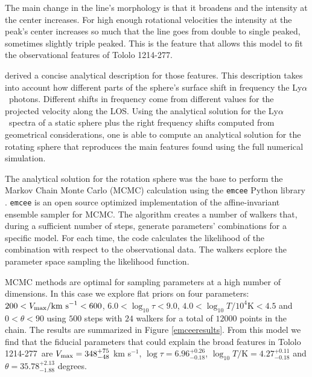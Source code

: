 \documentclass[a4paper, usenatbib, 12pt]{article}
\newcommand{\tol}{Tololo 1214-277}
\newcommand{\lya}{Ly$\alpha$}
\begin{document}
{The main change in the line's morphology is that it broadens and the
intensity at the center increases. 
For high enough rotational velocities the intensity at the peak's
center increases so much that the line goes from double to single
peaked, sometimes slightly triple peaked.
This is the feature that allows this model to fit the observational
features of \tol.

\cite{GaravitoCamargo2014} derived a concise analytical description for
those features. 
This description takes into account how different parts of the
sphere's surface shift in frequency the \lya\ photons. 
Different shifts in frequency come from different values for the projected
velocity along the LOS. 
Using the analytical solution for the \lya\ spectra of a static sphere
plus the right frequency shifts  computed from geometrical
considerations, one is able to compute an analytical solution for the
rotating sphere that reproduces the main features found using the full
numerical simulation. 

The analytical solution for the rotation sphere was the base to
perform the Markov Chain Monte Carlo (MCMC) calculation using the
\texttt{emcee} Python library \cite{2013PASP..125..306F}. \texttt{emcee} 
is an open source optimized implementation of the affine-invariant 
ensemble sampler for MCMC. The algorithm creates a number of walkers that,
during a sufficient number of steps, generate parameters' combinations for
a specific model. For each time, the code calculates the likelihood of the
combination with respect to the observational data. The walkers ecplore
the parameter space sampling the likelihood function.

MCMC methods are optimal for sampling parameters at a high number of 
dimensions. In this case we explore flat priors on four parameters:
$200<V_{\rm max}/\mathrm{km\ s}^{-1} <600$,  
$6.0<\log_{10}\tau<9.0$, $4.0<\log_{10} T/10^4\mathrm{K}< 4.5$ and
$0<\theta<90$ using $500$ steps with $24$ walkers for a total of
$12000$ points in the chain. 
The results are summarized in 
Figure \ref{emceeresults}. 
From this model we find that the fiducial 
parameters that could explain the broad features in \tol\ are 
$V_{\rm max}=348^{+75}_{-48}$ km s$^{-1}$, $\log \tau = 6.96^{+0.26}_{-0.18}$, 
$\log_{10} T/\mathrm {K} = 4.27^{+0.11}_{-0.18}$ and $\theta = 35.78^{+2.13}_{-1.88}$ 
degrees.


}
\end{document}
